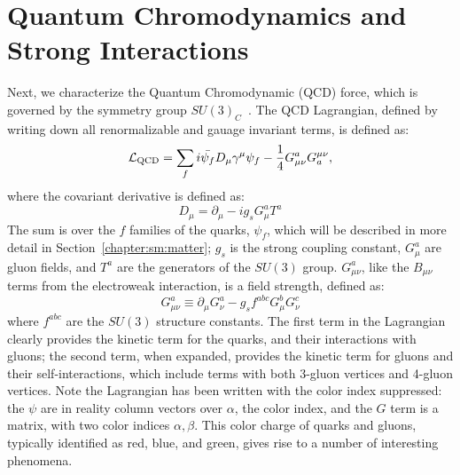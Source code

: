 \section{Quantum Chromodynamics and Strong Interactions}

Next, we characterize the Quantum Chromodynamic (QCD) force, which is governed by the symmetry group $SU(3)_C$~\cite{Politzer:1973fx,Gross:1973ju,Gross:1973id}. The QCD Lagrangian, defined by writing down all renormalizable and gauage invariant terms, is defined as:
%
\begin{equation}
\mathcal{L}_{\mathrm{QCD}} = \sum_f i \bar{\psi_f} D_\mu \gamma^\mu \psi_f - \frac{1}{4} G_{\mu\nu}^a G_{a}^{\mu\nu},
\end{equation}
%
where the covariant derivative is defined as:
%
\begin{equation}
D_\mu = \partial_\mu - i g_s G_\mu^a T^a
\end{equation}
%
The sum is over the $f$ families of the quarks, $\psi_f$, which will be described in more detail in Section~\ref{chapter:sm:matter}; $g_s$ is the strong coupling constant, $G_\mu^a$ are gluon fields, and $T^a$ are the generators of the $SU(3)$ group. $G_{\mu\nu}^a$, like the $B_{\mu\nu}$ terms from the electroweak interaction, is a field strength, defined as:
%
\begin{equation}
G_{\mu\nu}^a \equiv \partial_\mu G_\nu^a - g_s f^{abc}G_\mu^b G_\nu^c
\end{equation}
%
where $f^{abc}$ are the $SU(3)$ structure constants. The first term in the Lagrangian clearly provides the kinetic term for the quarks, and their interactions with gluons; the second term, when expanded, provides the kinetic term for gluons and their self-interactions, which include terms with both 3-gluon vertices and 4-gluon vertices. Note the Lagrangian has been written with the color index suppressed: the $\psi$ are in reality column vectors over $\alpha$, the color index, and the $G$ term is a matrix, with two color indices $\alpha, \beta$. This color charge of quarks and gluons, typically identified as red, blue, and green, gives rise to a number of interesting phenomena. %

